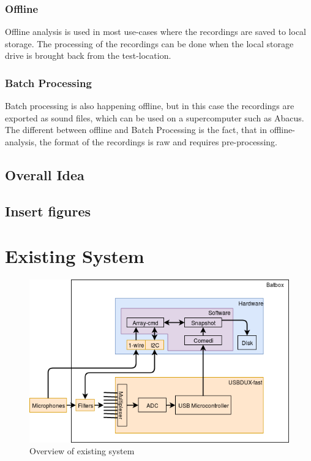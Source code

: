 \subsubsection{Offline}
Offline analysis is used in most use-cases where the recordings are saved to local storage. The processing of the recordings can be done when the local storage drive is brought back from the test-location.

\subsubsection{Batch Processing}
Batch processing is also happening offline, but in this case the recordings are exported as sound files, which can be used on a supercomputer such as Abacus. The different between offline and Batch Processing is the fact, that in offline-analysis, the format of the recordings is raw and requires pre-processing.

\subsection{Overall Idea}
\subsection{Insert figures}


\section{Existing System}

\begin{figure}[h!]
	\centering
	\includegraphics[width=1\textwidth]{figures/existing-system-overview.png} 
	\caption{Overview of existing system}\label{fig:existingsystem:overview}
\end{figure}




